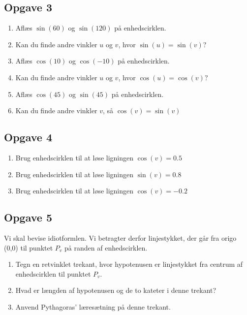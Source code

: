 


\subsection*{Opgave 3}

\begin{enumerate}[label=\roman*)]
	\item Aflæs $\sin(60)$ og $\sin(120)$ på enhedscirklen. 
	\item Kan du finde andre vinkler $u$ og $v$, hvor 
	$\sin(u)=\sin(v)?$
	\item Aflæs $\cos(10)$ og $\cos(-10)$ på enhedscirklen.
	\item Kan du finde andre vinkler $u$ og $v$, hvor 
	$\cos(u)=\cos(v)?$
	\item Aflæs $\cos(45)$ og $\sin(45)$ på enhedscirklen. 
	\item Kan du finde andre vinkler $v$, så $\cos(v)=\sin(v)$
\end{enumerate}

\subsection*{Opgave 4}
\begin{enumerate}[label=\roman*)]
	\item Brug enhedscirklen til at løse ligningen $\cos(v) = 0.5$
	\item Brug enhedscirklen til at løse ligningen $\sin(v) = 0.8$
	\item Brug enhedscirklen til at løse ligningen $\cos(v) = -0.2$
\end{enumerate}

\subsection*{Opgave 5}
Vi skal bevise idiotformlen. Vi betragter derfor linjestykket, der går fra origo (0,0) til punktet $P_v$ på randen af 
enhedscirklen. 
\begin{enumerate}[label=\roman*)]
	\item Tegn en retvinklet trekant, hvor hypotenusen er linjestykket fra centrum af enhedscirklen til 
	punktet $P_v$. 
	\item Hvad er længden af hypotenusen og de to kateter i denne trekant?
	\item Anvend Pythagoras' læresætning på denne trekant.
\end{enumerate}

